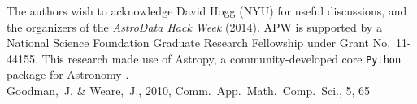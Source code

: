 \documentclass[letterpaper,12pt,preprint]{aastex}
\begin{document}
\acknowledgements
The authors wish to acknowledge David Hogg (NYU) for useful discussions, and the organizers of the \emph{AstroData Hack Week} (2014). 
APW is supported by a National Science Foundation Graduate Research Fellowship under Grant No.\ 11-44155. 
This research made use of Astropy, a community-developed core \texttt{Python} package for Astronomy \citep{astropy13}. \\



  
Goodman,~J. \& Weare,\ J.,
2010, Comm.\ App.\ Math.\ Comp.\ Sci., 5, 65
\end{document}
